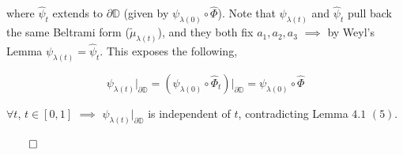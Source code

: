 \documentclass[11pt,a4paper]{article}
\begin{document}

        where $\hat{\psi}_t$ extends to $\partial \mathbb{D}$ (given by $\psi_{\lambda(0)}\circ \hat{\Phi}$). Note that $\psi_{\lambda(t)}$ and $\hat{\psi}_t$ pull back the same Beltrami form ($\tilde{\mu}_{\lambda(t)}$), and they both fix $a_1, a_2, a_3$ $\implies$ by Weyl's Lemma $\psi_{\lambda(t)} = \hat{\psi}_t$. This exposes the following,

        $$\psi_{\lambda(t)}\Big|_{\partial \mathbb{D}} = (\psi_{\lambda(0)} \circ \hat{\Phi}_t)\Big|_{\partial \mathbb{D}} = \psi_{\lambda(0)}\circ \hat{\Phi}$$



        $\forall t$, $t\in[0,1]$ $\implies$ $\psi_{\lambda(t)}\big|_{\partial\mathbb{D}}$ is independent of $t$, contradicting Lemma $4.1$ $(5)$.

        $\qed$







\end{document}

